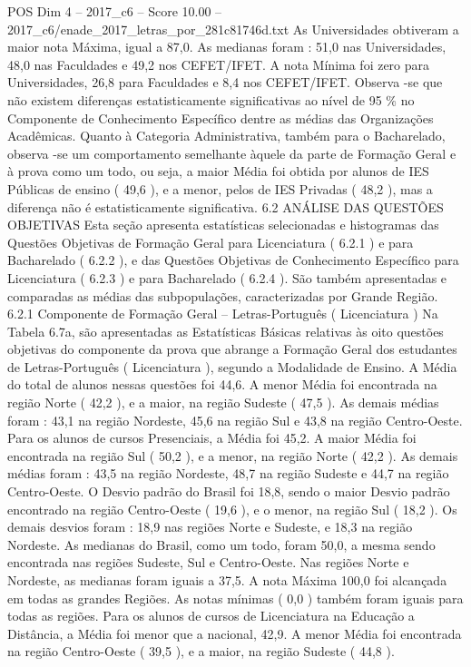 \begin{textsample}{POS Dim 4 – 2017\_c6 – Score 10.00 – 2017\_c6/enade\_2017\_letras\_por\_281c81746d.txt}
As Universidades obtiveram a maior nota Máxima, igual a 87,0.
As medianas foram : 51,0 nas Universidades, 48,0 nas Faculdades e 49,2 nos CEFET/IFET.
A nota Mínima foi zero para Universidades, 26,8 para Faculdades e 8,4 nos CEFET/IFET.
Observa -se que não existem diferenças estatisticamente significativas ao nível de 95 \% no Componente de Conhecimento Específico dentre as médias das Organizações Acadêmicas.
Quanto à Categoria Administrativa, também para o Bacharelado, observa -se um comportamento semelhante àquele da parte de Formação Geral e à prova como um todo, ou seja, a maior Média foi obtida por alunos de IES Públicas de ensino ( 49,6 ), e a menor, pelos de IES Privadas ( 48,2 ), mas a diferença não é estatisticamente significativa. 6.2 ANÁLISE DAS QUESTÕES OBJETIVAS Esta seção apresenta estatísticas selecionadas e histogramas das Questões Objetivas de Formação Geral para Licenciatura ( 6.2.1 ) e para Bacharelado ( 6.2.2 ), e das Questões Objetivas de Conhecimento Específico para Licenciatura ( 6.2.3 ) e para Bacharelado ( 6.2.4 ).
São também apresentadas e comparadas as médias das subpopulações, caracterizadas por Grande Região. 6.2.1 Componente de Formação Geral – Letras-Português ( Licenciatura ) Na Tabela 6.7a, são apresentadas as Estatísticas Básicas relativas às oito questões objetivas do componente da prova que abrange a Formação Geral dos estudantes de Letras-Português ( Licenciatura ), segundo a Modalidade de Ensino.
A Média do total de alunos nessas questões foi 44,6.
A menor Média foi encontrada na região Norte ( 42,2 ), e a maior, na região Sudeste ( 47,5 ).
As demais médias foram : 43,1 na região Nordeste, 45,6 na região Sul e 43,8 na região Centro-Oeste.
Para os alunos de cursos Presenciais, a Média foi 45,2.
A maior Média foi encontrada na região Sul ( 50,2 ), e a menor, na região Norte ( 42,2 ).
As demais médias foram : 43,5 na região Nordeste, 48,7 na região Sudeste e 44,7 na região Centro-Oeste.
O Desvio padrão do Brasil foi 18,8, sendo o maior Desvio padrão encontrado na região Centro-Oeste ( 19,6 ), e o menor, na região Sul ( 18,2 ).
Os demais desvios foram : 18,9 nas regiões Norte e Sudeste, e 18,3 na região Nordeste.
As medianas do Brasil, como um todo, foram 50,0, a mesma sendo encontrada nas regiões Sudeste, Sul e Centro-Oeste.
Nas regiões Norte e Nordeste, as medianas foram iguais a 37,5.
A nota Máxima 100,0 foi alcançada em todas as grandes Regiões.
As notas mínimas ( 0,0 ) também foram iguais para todas as regiões.
Para os alunos de cursos de Licenciatura na Educação a Distância, a Média foi menor que a nacional, 42,9.
A menor Média foi encontrada na região Centro-Oeste ( 39,5 ), e a maior, na região Sudeste ( 44,8 ).

\end{textsample}
